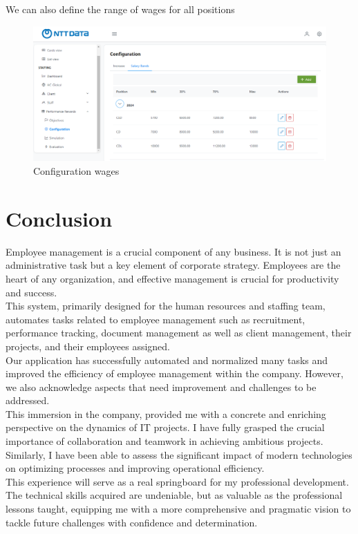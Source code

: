 \documentclass[12pt,a4paper,table,english]{article}
\begin{document}
	We can also define the range of wages for all positions
	\begin{figure}[H]
	\centering
	\includegraphics[width=150mm]{Image/confband}
	\caption{Configuration wages}
	\label{fig:Configuration wages}
	\end{figure}


	\newpage
	\section{Conclusion}

	Employee management is a crucial component of any business. It is not just an administrative task but a key element of corporate strategy. Employees are the heart of any organization, and effective management is crucial for productivity and success. \\
	This system, primarily designed for the human resources and staffing team, automates tasks related to employee management such as recruitment, performance tracking, document management as well as client management, their projects, and their employees assigned.\\
	
	Our application has successfully automated and normalized many tasks and improved the efficiency of employee management within the company. However, we also acknowledge aspects that need improvement and challenges to be addressed.\\
	
	This immersion in the company, provided me with a concrete and enriching perspective on the dynamics of IT projects. I have fully grasped the crucial importance of collaboration and teamwork in achieving ambitious projects. Similarly, I have been able to assess the significant impact of modern technologies on optimizing processes and improving operational efficiency.\\
	
	This experience will serve as a real springboard for my professional development. The technical skills acquired are undeniable, but as valuable as the professional lessons taught, equipping me with a more comprehensive and pragmatic vision to tackle future challenges with confidence and determination.
	

	\newpage
	
	
	\newpage
	

%	
\end{document}

